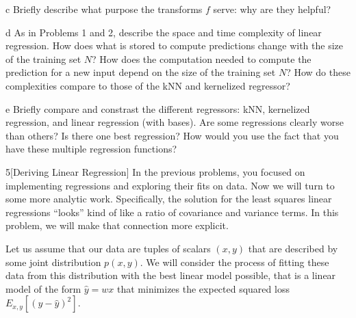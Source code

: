 \documentclass[expanded]{lkx_pset}
\begin{document}
\begin{parts}
  \begin{part}{c}
    Briefly describe what purpose the transforms $f$ serve: why are they helpful?
  \end{part}

  \begin{part}{d}
    As in Problems 1 and 2, describe the space and time complexity of linear regression.  How does what is stored to compute predictions change with the size of the training set $N$?  How does the computation needed to compute the prediction for a new input depend on the size of the training set $N$?  How do these complexities compare to those of the kNN and kernelized regressor?
  \end{part}

  \begin{part}{e}
    Briefly compare and constrast the different regressors: kNN,
    kernelized regression, and linear regression (with bases).  Are some
    regressions clearly worse than others?  Is there one best
    regression?  How would you use the fact that you have these multiple
    regression functions?
  \end{part}

\end{parts}

\begin{problem}{5}[Deriving Linear Regression]
  In the previous problems, you focused on implementing regressions
  and exploring their fits on data. Now we will turn to some more
  analytic work.  Specifically, the solution for the least squares
  linear regressions ``looks'' kind of like a ratio of covariance and
  variance terms.  In this problem, we will make that connection more
  explicit.

  \medskip
  Let us assume that our data are tuples of scalars $(x,y)$ that are
  described by some joint distribution $p(x,y)$. We will consider the process of fitting these data from this distribution with the best linear model
  possible, that is a linear model of the form $\hat{y} = wx$ that
  minimizes the expected squared loss $E_{x,y}[ ( y - \hat{y} )^2
  ]$.
\end{problem}
  
\end{document}
